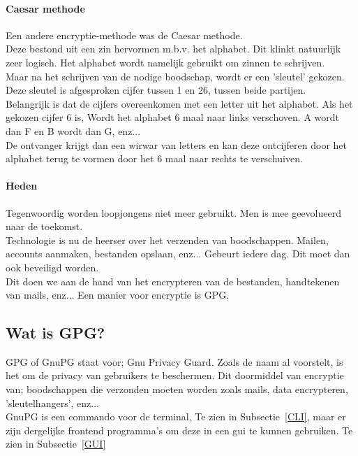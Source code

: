 \documentclass[12pt]{article}
\begin{document}
			\paragraph{Caesar methode}
				Een andere encryptie-methode was de Caesar methode.\\
				Deze bestond uit een zin hervormen m.b.v. het alphabet. Dit klinkt natuurlijk zeer 						logisch.
				Het alphabet wordt namelijk gebruikt om zinnen te schrijven.\\
				Maar na het schrijven van de nodige boodschap, wordt er een 'sleutel' gekozen. Deze 					sleutel is afgesproken cijfer tussen 1 en 26, tussen beide partijen.\\
				Belangrijk is dat de cijfers overeenkomen met een letter uit het alphabet. Als het 						gekozen cijfer 6 is, Wordt het alphabet 6 maal naar links verschoven. A wordt dan F 					en B wordt dan G, enz...\\
				De ontvanger krijgt dan een wirwar van letters en kan deze ontcijferen door het 						alphabet terug te vormen door het 6 maal naar rechts te verschuiven.\\

			\newpage
			\paragraph{Heden}
				Tegenwoordig worden loopjongens niet meer gebruikt. Men is mee geevolueerd naar de 						toekomst.\\
				Technologie is nu de heerser over het verzenden van boodschappen.
				Mailen, accounts aanmaken, bestanden opslaan, enz... Gebeurt iedere dag. Dit moet dan 					ook beveiligd worden.\\
				Dit doen we aan de hand van het encrypteren van de bestanden, handtekenen van mails,
				enz...
				Een manier voor encryptie is GPG.

			\newpage
			\subsection{Wat is GPG?}
				GPG of GnuPG staat voor; Gnu Privacy Guard. Zoals de naam al voorstelt, is het om de 					privacy van gebruikers te beschermen. Dit doormiddel van encryptie van; boodschappen 					die verzonden moeten worden zoals mails, data encrypteren, 'sleutelhangers', enz... 					\\
				GnuPG is een commando voor de terminal, Te zien in Subsectie~\ref{CLI}, maar er zijn 					dergelijke frontend programma's om deze in een gui te kunnen gebruiken. Te zien in 						Subsectie~\ref{GUI}
\end{document}

